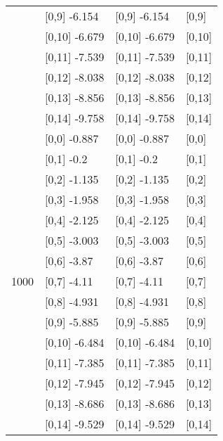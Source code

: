 \begin{table}
\begin{tabular}[t]{llll}
 & {}[0,9] -6.154 & {}[0,9] -6.154 & {}[0,9]\\
\addlinespace
 & {}[0,10] -6.679 & {}[0,10] -6.679 & {}[0,10]\\
 & {}[0,11] -7.539 & {}[0,11] -7.539 & {}[0,11]\\
 & {}[0,12] -8.038 & {}[0,12] -8.038 & {}[0,12]\\
 & {}[0,13] -8.856 & {}[0,13] -8.856 & {}[0,13]\\
 & {}[0,14] -9.758 & {}[0,14] -9.758 & {}[0,14]\\
\addlinespace
 & {}[0,0] -0.887 & {}[0,0] -0.887 & {}[0,0]\\
 & {}[0,1] -0.2 & {}[0,1] -0.2 & {}[0,1]\\
 & {}[0,2] -1.135 & {}[0,2] -1.135 & {}[0,2]\\
 & {}[0,3] -1.958 & {}[0,3] -1.958 & {}[0,3]\\
 & {}[0,4] -2.125 & {}[0,4] -2.125 & {}[0,4]\\
\addlinespace
 & {}[0,5] -3.003 & {}[0,5] -3.003 & {}[0,5]\\
 & {}[0,6] -3.87 & {}[0,6] -3.87 & {}[0,6]\\
1000 & {}[0,7] -4.11 & {}[0,7] -4.11 & {}[0,7]\\
 & {}[0,8] -4.931 & {}[0,8] -4.931 & {}[0,8]\\
 & {}[0,9] -5.885 & {}[0,9] -5.885 & {}[0,9]\\
\addlinespace
 & {}[0,10] -6.484 & {}[0,10] -6.484 & {}[0,10]\\
 & {}[0,11] -7.385 & {}[0,11] -7.385 & {}[0,11]\\
 & {}[0,12] -7.945 & {}[0,12] -7.945 & {}[0,12]\\
 & {}[0,13] -8.686 & {}[0,13] -8.686 & {}[0,13]\\
 & {}[0,14] -9.529 & {}[0,14] -9.529 & {}[0,14]\\
\bottomrule
\end{tabular}
\end{table}

